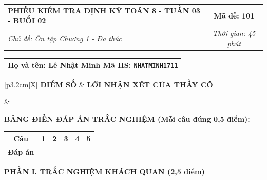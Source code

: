 \documentclass[12pt,a4paper]{article}
\begin{document}
\newpage



\noindent
\begin{tabularx}{\linewidth}{|X|c|}
\hline
\textbf{PHIẾU KIỂM TRA ĐỊNH KỲ TOÁN 8 - TUẦN 03 - BUỔI 02} & \textbf{Mã đề: 101} \\
\textit{Chủ đề: Ôn tập Chương 1 - Đa thức} & \textit{Thời gian: 45 phút} \\
\hline
\end{tabularx}

\vspace{1mm}

\noindent
\begin{tabularx}{\linewidth}{|X|}
\hline
\rule[-2mm]{0pt}{7.5mm}\textbf{Họ và tên:} \textbf{\large Lê Nhật Minh} \hfill \textbf{Mã HS:} \texttt{NHATMINH1711} \quad \\
\hline
\end{tabularx}

\vspace{1mm}

\noindent
\begin{tabularx}{\linewidth}{|p{3.2cm}|X|}
\hline
\centering\textbf{ĐIỂM SỐ} & \centering\textbf{LỜI NHẬN XÉT CỦA THẦY CÔ} \tabularnewline
\hline
\rule{0pt}{1.3cm} & \tabularnewline
\hline
\end{tabularx}

\vspace{1.2mm}

\noindent\textbf{BẢNG ĐIỀN ĐÁP ÁN TRẮC NGHIỆM (Mỗi câu đúng 0,5 điểm):}
\vspace{0.8mm}

\noindent
\renewcommand{\arraystretch}{1.35}
\begin{tabularx}{\linewidth}{|c|*{5}{>{\centering\arraybackslash}X|}}
\hline
\textbf{Câu} & \textbf{1} & \textbf{2} & \textbf{3} & \textbf{4} & \textbf{5} \\
\hline
\textbf{Đáp án} & & & & & \\
\hline
\end{tabularx}
\renewcommand{\arraystretch}{1.0}

\vspace{1.5mm}

\noindent\textbf{\large PHẦN I. TRẮC NGHIỆM KHÁCH QUAN (2,5 điểm)}
\vspace{1mm}
\end{document}
